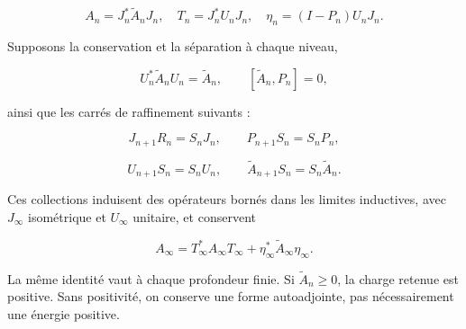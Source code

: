 \[
A_n=J_n^*\widetilde A_nJ_n,\quad
T_n=J_n^*U_nJ_n,\quad
\eta_n=(I-P_n)U_nJ_n.
\]

Supposons la conservation et la séparation à chaque niveau,

\begin{equation}
U_n^*\widetilde A_nU_n=\widetilde A_n,
\qquad [\widetilde A_n,P_n]=0,
\label{nuc01:eq:8}
\end{equation}

ainsi que les carrés de raffinement suivants :

\begin{equation}
J_{n+1}R_n=S_nJ_n,\qquad
P_{n+1}S_n=S_nP_n,
\label{nuc01:eq:9}
\end{equation}

\begin{equation}
U_{n+1}S_n=S_nU_n,\qquad
\widetilde A_{n+1}S_n=S_n\widetilde A_n.
\label{nuc01:eq:10}
\end{equation}

\begin{theorem}
Ces collections induisent des opérateurs bornés dans les limites inductives, avec \(J_\infty\) isométrique et \(U_\infty\) unitaire, et conservent

\begin{equation}
A_\infty
=T_\infty^*A_\infty T_\infty
 +\eta_\infty^*\widetilde A_\infty\eta_\infty.
\label{nuc01:eq:11}
\end{equation}

La même identité vaut à chaque profondeur finie. Si \(\widetilde A_n\geq0\), la charge retenue est positive. Sans positivité, on conserve une forme autoadjointe, pas nécessairement une énergie positive.
\end{theorem}

